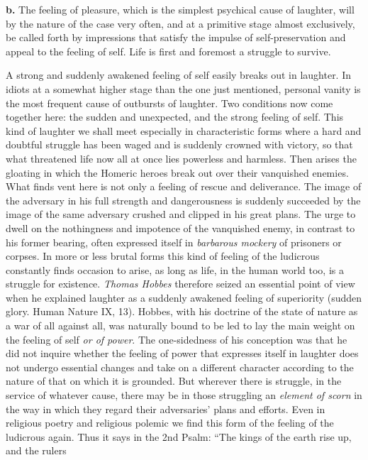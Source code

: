 \documentclass[12pt,a4paper]{book}
\newcommand{\opage}[1]{\marginnote{\footnotesize\textit{[#1]}}}
\begin{document}
\textbf{b.} The feeling of pleasure, which is the simplest psychical
cause of laughter, will by the nature of the case very often, and at a
primitive stage almost exclusively, be called forth by impressions
\opage{346}that satisfy the impulse of self-preservation and appeal to
the feeling of self. Life is first and foremost a struggle to survive.

A strong and suddenly awakened feeling of self easily breaks out in
laughter. In idiots at a somewhat higher stage than the one just
mentioned, personal vanity is the most frequent cause of outbursts of
laughter. Two conditions now come together here: the sudden and
unexpected, and the strong feeling of self. This kind of laughter we
shall meet especially in characteristic forms where a hard and doubtful
struggle has been waged and is suddenly crowned with victory, so that
what threatened life now all at once lies powerless and harmless. Then
arises the gloating in which the Homeric heroes break out over their
vanquished enemies. What finds vent here is not only a feeling of rescue
and deliverance. The image of the adversary in his full strength and
dangerousness is suddenly succeeded by the image of the same adversary
crushed and clipped in his great plans. The urge to dwell on the
nothingness and impotence of the vanquished enemy, in contrast to his
former bearing, often expressed itself in \emph{barbarous mockery} of
prisoners or corpses. In more or less brutal forms this kind of feeling
of the ludicrous constantly finds occasion to arise, as long as life,
in the human world too, is a struggle for existence. \emph{Thomas
Hobbes} therefore seized an essential point of view when he explained
laughter as a suddenly awakened feeling of superiority (sudden glory.
Human Nature IX, 13). Hobbes, with his doctrine of the state of nature
as a war of all against all, was naturally bound to be led to lay the
main weight on the feeling of self \emph{or of power}. The one-sidedness
of his conception was that he did not inquire whether the feeling of
power that expresses itself in laughter does not undergo essential
changes and take on a different character according to the nature of
that on which it is grounded. But wherever there is struggle, in the
service of whatever cause, there may be in those struggling an
\emph{element of scorn} in the way in which they regard their
adversaries' plans and efforts. Even in religious poetry and religious
polemic we find this form of the feeling of the ludicrous again. Thus it
says in the 2nd Psalm: ``The kings of the earth rise up, and the rulers
\end{document}
